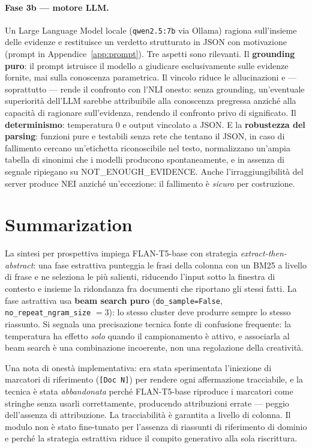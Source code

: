 \documentclass[11pt,a4paper]{report}
\begin{document}
\paragraph{Fase 3b --- motore LLM.} Un Large Language Model locale (\texttt{qwen2.5:7b} via
Ollama) ragiona sull'insieme delle evidenze e restituisce un verdetto strutturato in JSON con
motivazione (prompt in Appendice~\ref{app:prompt}). Tre aspetti sono rilevanti. Il
\textbf{grounding puro}: il prompt istruisce il modello a giudicare esclusivamente sulle evidenze
fornite, mai sulla conoscenza parametrica. Il vincolo riduce le allucinazioni e --- soprattutto
--- rende il confronto con l'NLI onesto: senza grounding, un'eventuale superiorità dell'LLM
sarebbe attribuibile alla conoscenza pregressa anziché alla capacità di ragionare sull'evidenza,
rendendo il confronto privo di significato. Il \textbf{determinismo}: temperatura $0$ e output
vincolato a JSON. E la \textbf{robustezza del parsing}: funzioni pure e testabili senza rete che
tentano il JSON, in caso di fallimento cercano un'etichetta riconoscibile nel testo, normalizzano
un'ampia tabella di sinonimi che i modelli producono spontaneamente, e in assenza di segnale
ripiegano su NOT\_ENOUGH\_EVIDENCE. Anche l'irraggiungibilità del server produce NEI anziché
un'eccezione: il fallimento è \emph{sicuro} per costruzione.

\section{Summarization}
La sintesi per prospettiva impiega FLAN-T5-base con strategia \emph{extract-then-abstract}: una
fase estrattiva punteggia le frasi della colonna con un BM25 a livello di frase e ne seleziona le
più salienti, riducendo l'input sotto la finestra di contesto e insieme la ridondanza fra
documenti che riportano gli stessi fatti. La fase astrattiva usa \textbf{beam search puro}
(\texttt{do\_sample=False}, \texttt{no\_repeat\_ngram\_size} $=3$): lo stesso cluster deve
produrre sempre lo stesso riassunto. Si segnala una precisazione tecnica fonte di confusione
frequente: la temperatura ha effetto \emph{solo} quando il campionamento è attivo, e associarla al
beam search è una combinazione incoerente, non una regolazione della creatività.

Una nota di onestà implementativa: era stata sperimentata l'iniezione di marcatori di riferimento
(\texttt{[Doc N]}) per rendere ogni affermazione tracciabile, e la tecnica è stata
\emph{abbandonata} perché FLAN-T5-base riproduce i marcatori come stringhe senza usarli
correttamente, producendo attribuzioni errate --- peggio dell'assenza di attribuzione. La
tracciabilità è garantita a livello di colonna. Il modulo non è stato fine-tunato per l'assenza di
riassunti di riferimento di dominio e perché la strategia estrattiva riduce il compito generativo
alla sola riscrittura.
\end{document}
